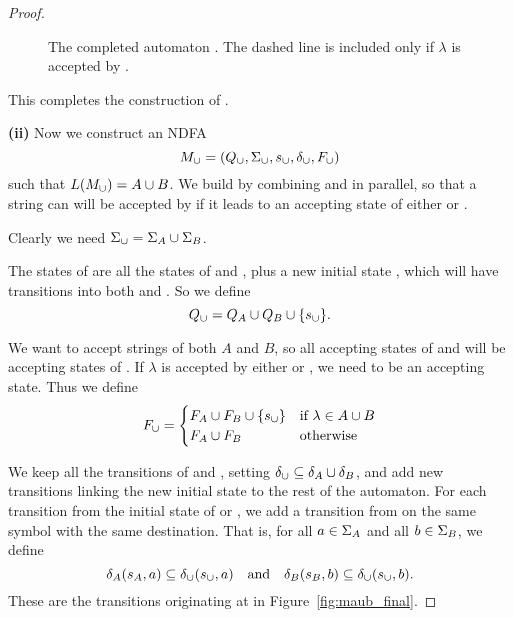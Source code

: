 \documentclass{bcthesis}
\begin{document}
\begin{proof}
\begin{figure}[H]
			\caption{
				The completed automaton \mab.
				The dashed line is included only if $\lambda$ is accepted by \ma.
			}
			\label{fig:mab_final}
		\end{figure}
		This completes the construction of \mab.

		\noindent \textbf{(ii)} \hspace{\parindent}
		Now we construct an NDFA 
		\[
			M_{\cup} = (Q_{\cup}, \Sigma_{\cup}, s_{\cup}, \delta_{\cup}, F_{\cup})
		\] 
		such that $L(M_{\cup}) = A \cup B$.
		We build \maub by combining \ma and \mb in parallel, so that a string can will be accepted by \maub if it leads to an accepting state of either \ma or \mb.
		
		Clearly we need $\Sigma_{\cup} = \Sigma_A \cup \Sigma_B$.

		The states of \maub are all the states of \ma and \mb, plus a new initial state \saub, which will have transitions into both \ma and \mb.
		So we define 
		\[
			Q_{\cup} = Q_A \cup Q_B \cup \{ s_{\cup} \}.
		\]

		We want \maub to accept strings of both $A$ and $B$, so all accepting states of \ma and \mb will be accepting states of \maub.
		If $\lambda$ is accepted by either \ma or \mb, we need \saub to be an accepting state. 
		Thus we define 
		\[
			F_{\cup} =	\begin{cases}
						F_A \cup F_B \cup \{ s_{\cup} \} &\text{if } \lambda \in A \cup B \\
						F_A \cup F_B &\text{otherwise}
					\end{cases}
		\]

		We keep all the transitions of \ma and \mb, setting $\delta_{\cup} \subseteq \delta_A \cup \delta_B$, and add new transitions linking the new initial state to the rest of the automaton.
		For each transition from the initial state of \ma or \mb, we add a transition from \saub on the same symbol with the same destination.
		That is, for all $a \in \Sigma_A$ and all $b \in \Sigma_B$, we define
		\[
			\delta_A(s_A, a) \subseteq \delta_{\cup}(s_{\cup}, a) \quad \text{and} \quad \delta_B(s_B, b) \subseteq \delta_{\cup}(s_{\cup}, b).
		\]
		These are the transitions originating at \saub in Figure~\ref{fig:maub_final}.


\end{proof}
\end{document}

